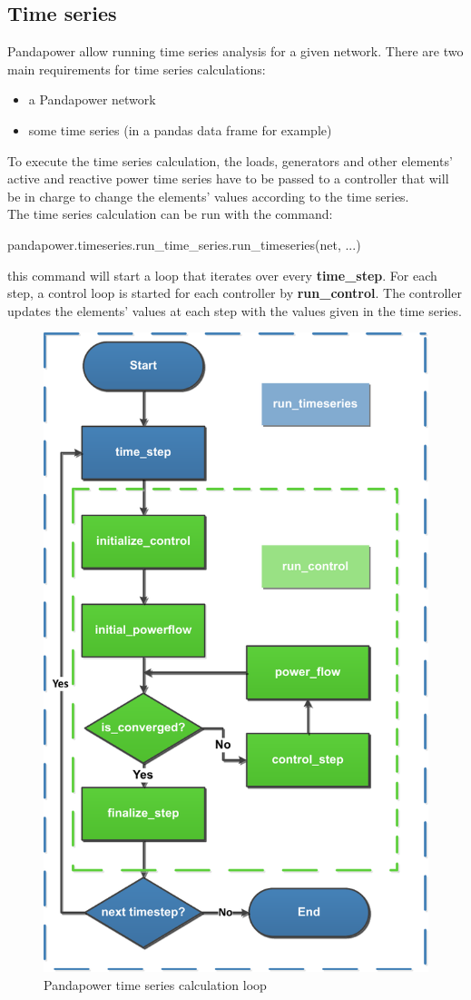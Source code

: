 \subsection{Time series}
Pandapower allow running time series analysis for a given network. There are two main requirements for time series calculations:
\begin{itemize}
    \item a Pandapower network
    \item some time series (in a pandas data frame for example)
\end{itemize}

To execute the time series calculation, the loads, generators and other elements' active and reactive power time series have to be passed to a controller that will be in charge to change the elements' values according to the time series. \\

The time series calculation can be run with the command: 
\begin{algorithm}[h]
\state pandapower.timeseries.run\_time\_series.run\_timeseries(net, ...)
\end{algorithm}

\noindent this command will start a loop that iterates over every \textbf{time\_step}. For each step, a control loop is started for each controller by \textbf{run\_control}. The controller updates the elements' values at each step with the values given in the time series.

\begin{figure}[H]
\centering
    \includegraphics[width=.4\linewidth]{images/Background/Pandapower/run_timeseries_loop.pdf}
\caption{Pandapower time series calculation loop \cite{pandapowerts}}
\end{figure}

